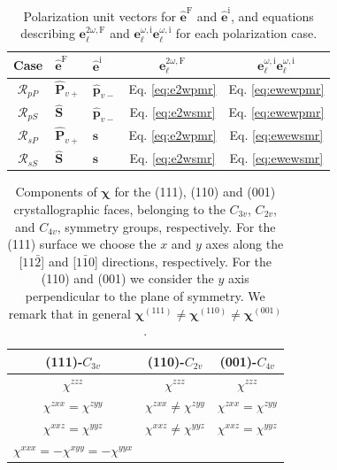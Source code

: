 \begin{table}
\centering
\begin{tabular}{| c | l | l | c | c |}
\hline
Case               & $\hat{\mathbf{e}}^{\mathrm{F}}$
                   & $\hat{\mathbf{e}}^{\mathrm{i}}$
                   & $\mathbf{e}^{2\omega,\mathrm{F}}_{\ell}$
                   & $\mathbf{e}^{\omega,\mathrm{i}}_{\ell}
                      \mathbf{e}^{\omega,\mathrm{i}}_{\ell}$ \\
\hline
$\mathcal{R}_{pP}$ & $\hat{\mathbf{P}}_{v+}$
                   & $\hat{\mathbf{p}}_{v-}$
                   &  Eq. \eqref{eq:e2wpmr} & Eq. \eqref{eq:ewewpmr} \\
$\mathcal{R}_{pS}$ & $\hat{\mathbf{S}}$
                   & $\hat{\mathbf{p}}_{v-}$
                   &  Eq. \eqref{eq:e2wsmr} & Eq. \eqref{eq:ewewpmr} \\
$\mathcal{R}_{sP}$ & $\hat{\mathbf{P}}_{v+}$
                   & $\hat{\mathbf{s}}$
                   &  Eq. \eqref{eq:e2wpmr} & Eq. \eqref{eq:ewewsmr} \\
$\mathcal{R}_{sS}$ & $\hat{\mathbf{S}}$
                   & $\hat{\mathbf{s}}$
                   &  Eq. \eqref{eq:e2wsmr} & Eq. \eqref{eq:ewewsmr} \\
\hline
\end{tabular}
\caption{Polarization unit vectors for $\hat{\mathbf{e}}^{\mathrm{F}}$ and
$\hat{\mathbf{e}}^{\mathrm{i}}$, and equations describing
$\mathbf{e}^{2\omega,\mathrm{F}}_{\ell}$ and
$\mathbf{e}^{\omega,\mathrm{i}}_{\ell}\mathbf{e}^{\omega,\mathrm{i}}_{\ell}$ for
each polarization case.}
\label{tab:summary}
\end{table}

\begin{table}
\centering
\begin{tabular}{| c | c | c |}
\hline 
(111)-$C_{3v}$     & (110)-$C_{2v}$  & (001)-$C_{4v}$ \\
\hline 
$\chi^{zzz}$ & $\chi^{zzz}$ & $\chi^{zzz}$\\
$\chi^{zxx}=\chi^{zyy}$ & $\chi^{zxx}\ne\chi^{zyy}$ & $\chi^{zxx}=\chi^{zyy}$\\
$\chi^{xxz}=\chi^{yyz}$ & $\chi^{xxz}\ne\chi^{yyz}$ & $\chi^{xxz}=\chi^{yyz}$\\
$\chi^{xxx}=-\chi^{xyy}=-\chi^{yyx}$ & &  \\
\hline 
\end{tabular}
\caption{Components of $\boldsymbol{\chi}$ for the (111), (110) and (001)
crystallographic faces, belonging to the $C_{3v}$, $C_{2v}$, and $C_{4v}$,
symmetry groups, respectively. For the (111) surface we choose the $x$ and $y$
axes along the [$11\bar{2}$] and [$1\bar{1}0$] directions, respectively. For the
(110) and (001) we consider the $y$ axis perpendicular to the plane of
symmetry.\cite{sipePRB87} We remark that in general
$\boldsymbol{\chi}^{(111)}\ne \boldsymbol{\chi}^{(110)} \ne
\boldsymbol{\chi}^{(001)}$.}
\label{tab:chis}
\end{table}

